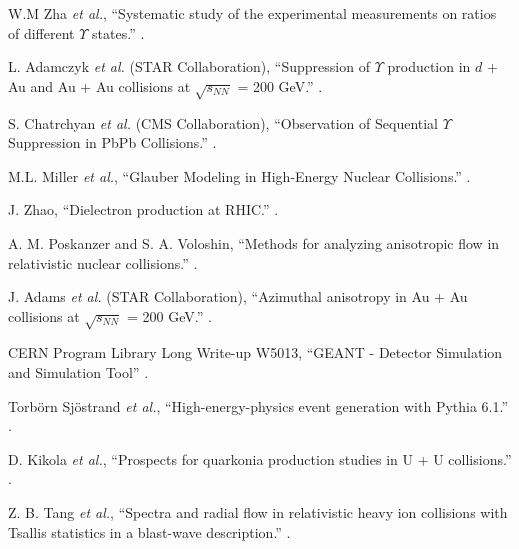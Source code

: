 \begin{thebibliography}{10}
 W.M Zha {\it et al.},
\newblock ``Systematic study of the experimental measurements on ratios of different $\varUpsilon$ states.''
.

 L. Adamczyk {\it et al.} (STAR Collaboration),
\newblock ``Suppression of $\varUpsilon$ production in $d$ + Au and Au + Au collisions at $\sqrt{s_{NN}}$ = 200 GeV.''
.

 S. Chatrchyan {\it et al.} (CMS Collaboration),
\newblock ``Observation of Sequential  $\varUpsilon$ Suppression in PbPb Collisions.''
.

M.L. Miller {\it et al.},
\newblock ``Glauber Modeling in High-Energy Nuclear Collisions.''
.

J. Zhao,
\newblock ``Dielectron production at RHIC.”
.

A. M. Poskanzer and S. A. Voloshin,
\newblock ``Methods for analyzing anisotropic flow in relativistic nuclear collisions.''
.

J. Adams {\it et al.} (STAR Collaboration),
\newblock ``Azimuthal anisotropy in Au + Au collisions at $\sqrt{s_{NN}}$ = 200 GeV.''
.

CERN Program Library Long Write-up W5013,
\newblock ``GEANT - Detector Simulation and Simulation Tool''
.

Torb\"orn Sj\"ostrand {\it et al.},
\newblock ``High-energy-physics event generation with Pythia 6.1.''
.

D. Kikola {\it et al.},
\newblock ``Prospects for quarkonia production studies in U + U collisions.''
.

Z. B. Tang {\it et al.},
\newblock ``Spectra and radial flow in relativistic heavy ion collisions with Tsallis statistics in a blast-wave description.''
.


\end{thebibliography}
